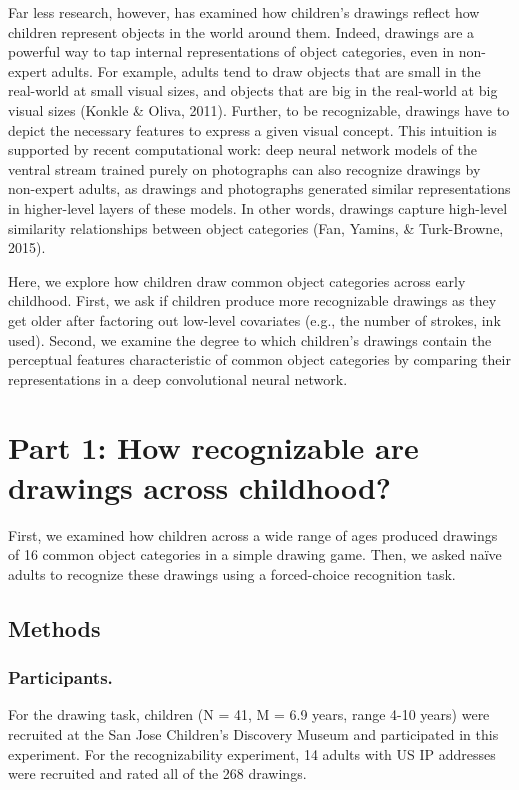 \documentclass[10pt, letterpaper]{article}
\begin{document}
Far less research, however, has examined how children's drawings reflect
how children represent objects in the world around them. Indeed,
drawings are a powerful way to tap internal representations of object
categories, even in non-expert adults. For example, adults tend to draw
objects that are small in the real-world at small visual sizes, and
objects that are big in the real-world at big visual sizes (Konkle \&
Oliva, 2011). Further, to be recognizable, drawings have to depict the
necessary features to express a given visual concept. This intuition is
supported by recent computational work: deep neural network models of
the ventral stream trained purely on photographs can also recognize
drawings by non-expert adults, as drawings and photographs generated
similar representations in higher-level layers of these models. In other
words, drawings capture high-level similarity relationships between
object categories (Fan, Yamins, \& Turk-Browne, 2015).

Here, we explore how children draw common object categories across early
childhood. First, we ask if children produce more recognizable drawings
as they get older after factoring out low-level covariates (e.g., the
number of strokes, ink used). Second, we examine the degree to which
children's drawings contain the perceptual features characteristic of
common object categories by comparing their representations in a deep
convolutional neural network.

\section{Part 1: How recognizable are drawings across
childhood?}\label{part-1-how-recognizable-are-drawings-across-childhood}

First, we examined how children across a wide range of ages produced
drawings of 16 common object categories in a simple drawing game. Then,
we asked naïve adults to recognize these drawings using a forced-choice
recognition task.

\subsection{Methods}\label{methods}

\subsubsection{Participants.}\label{participants.}

For the drawing task, children (N = 41, M = 6.9 years, range 4-10 years)
were recruited at the San Jose Children's Discovery Museum and
participated in this experiment. For the recognizability experiment, 14
adults with US IP addresses were recruited and rated all of the 268
drawings.
\end{document}
